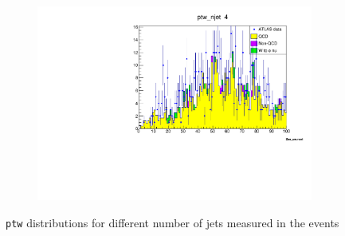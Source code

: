 \begin{figure}[H]
\begin{subfigure}{0.5\textwidth}
            \includegraphics[width=\textwidth]{../W_mass/ptw_njet4.pdf}
        \end{subfigure}
        \caption{\texttt{ptw} distributions for different number of jets measured in the events}
        \label{fig:ptw_jets}
    \end{figure}
    
